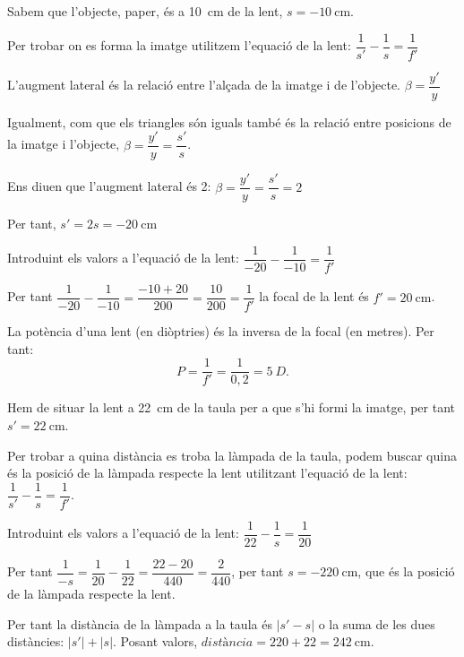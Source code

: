 \begin{solapartat}
Sabem que l'objecte, paper, és a 10~cm de la lent, $s=-10\ \mathrm{cm}$.

 Per trobar on es forma la imatge utilitzem l'equació de la lent: $\dfrac{1}{s'} - \dfrac{1}{s} = \dfrac{1}{f'}$

L'augment lateral és la relació entre l'alçada de la imatge i de l'objecte. $\beta = \dfrac{y'}{y}$

Igualment, com que els triangles són iguals també és la relació entre posicions de la imatge i l'objecte, $\beta = \dfrac{y'}{y} = \dfrac{s'}{s}$.

 Ens diuen que l'augment lateral és 2: $\beta = \dfrac{y'}{y} = \dfrac{s'}{s} = 2$

Per tant, $s' = 2s = -20\ \mathrm{cm}$

 Introduint els valors a l'equació de la lent: $\dfrac{1}{-20} - \dfrac{1}{-10} = \dfrac{1}{f'}$

 Per tant $\dfrac{1}{-20} - \dfrac{1}{-10} = \dfrac{-10+20}{200} = \dfrac{10}{200} = \dfrac{1}{f'}$ la focal de la lent és $f' = 20\ \mathrm{cm}$. %

 La potència d'una lent (en diòptries) és la inversa de la focal (en metres). Per tant:
\[ P = \frac{1}{f'} = \frac{1}{0,2} = 5\ D. \]
\end{solapartat}

\begin{solapartat}
 Hem de situar la lent a 22~cm de la taula per a que s'hi formi la imatge, per tant $s'=22\ \mathrm{cm}$.

 Per trobar a quina distància es troba la làmpada de la taula, podem buscar quina és la posició de la làmpada respecte la lent utilitzant l'equació de la lent: $\dfrac{1}{s'} - \dfrac{1}{s} = \dfrac{1}{f'}$.

 Introduint els valors a l'equació de la lent: $\dfrac{1}{22} - \dfrac{1}{s} = \dfrac{1}{20}$

 Per tant $\dfrac{1}{-s} = \dfrac{1}{20} - \dfrac{1}{22} = \dfrac{22-20}{440} = \dfrac{2}{440}$, per tant $s=-220\ \mathrm{cm}$, que és la posició de la làmpada respecte la lent.

 Per tant la distància de la làmpada a la taula és $|s' - s|$ o la suma de les dues distàncies: $|s'| + |s|$. Posant valors, $\textit{distància} = 220 + 22 = 242\ \mathrm{cm}$.
\end{solapartat}
